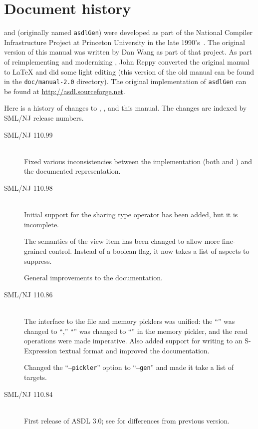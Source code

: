 %
\chapter{Document history}
\label{ch:history}

\asdl{} and \asdlgen{} (originally named \texttt{asdlGen}) were developed as part
of the National Compiler Infrastructure Project at Princeton University in the
late 1990's~\cite{usenix:zephyr-asdl}.
The original version of this manual was written by Dan Wang as part of that project.
As part of reimplementing and modernizing \asdl{}, John Reppy converted the original
manual to \LaTeX{} and did some light editing (this version of the old manual
can be found in the \texttt{doc/manual-2.0} directory).
The original implementation of \texttt{asdlGen} can be
found at \url{http://asdl.sourceforge.net}.

Here is a history of changes to \asdl{}, \asdlgen{}, and this manual.
The changes are indexed by SML/NJ release numbers.

\begin{description}
  \item[SML/NJ 110.99]
    \mbox{}\\[0.5em]
    Fixed various inconsistencies between the implementation (both \Cplusplus{} and 
    \sml{}) and the documented representation.
    
  \item[SML/NJ 110.98]
    \mbox{}\\[0.5em]
    Initial support for the sharing type operator has been added, but it is incomplete.
   
    The semantics of the  view item has been changed to allow more
    fine-grained control.  Instead of a boolean flag, it now takes a list of
    aspects to suppress.
    
    General improvements to the documentation.

  \item[SML/NJ 110.86]
    \mbox{}\\[0.5em]
    The interface to the file and memory picklers was unified: the ``''
    was changed to ``,'' ``'' was changed to
    ``'' in the memory pickler, and the read operations were made
    imperative.
    Also added support for writing to an S-Expression textual format and improved
    the documentation.

    Changed the ``\texttt{--pickler}'' option to ``\texttt{--gen}'' and made it take
    a list of targets.

  \item[SML/NJ 110.84]
    \mbox{}\\[0.5em]
    First release of ASDL 3.0; see  for differences from previous
    version.
\end{description}%
